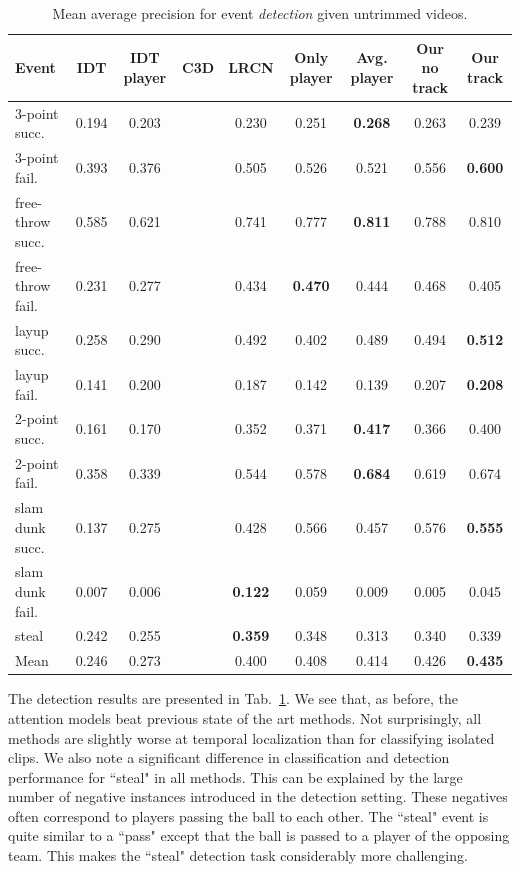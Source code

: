 \begin{table}[ht!]
\begin{center}
\small
 \begin{tabular}{|l|c|c|c|c|c|c|c|c|}
  \hline
Event & IDT\cite{Wang_CVPR11} & IDT player\cite{Wang_CVPR11} & C3D \cite{Tran_arxiv14} & LRCN \cite{Donahue_arxiv14} & Only player & Avg. player & Our no track & Our track \\ \hline \hline
3-point succ.    & 0.194  & 0.203 &  & 0.230 & 0.251 & \textbf{0.268} & 0.263 & 0.239 \\
3-point fail.    & 0.393  & 0.376 &  & 0.505 & 0.526 & 0.521 & 0.556 & \textbf{0.600} \\
free-throw succ. & 0.585  & 0.621 &  & 0.741 & 0.777 & \textbf{0.811} & 0.788 & 0.810 \\
free-throw fail. & 0.231  & 0.277 &  & 0.434 & \textbf{0.470} & 0.444 & 0.468 & 0.405 \\
layup succ.      & 0.258  & 0.290 &  & 0.492 & 0.402 & 0.489 & 0.494 & \textbf{0.512} \\
layup fail.      & 0.141  & 0.200 &  & 0.187 & 0.142 & 0.139 & 0.207 & \textbf{0.208} \\
2-point succ.    & 0.161  & 0.170 &  & 0.352 & 0.371 & \textbf{0.417} & 0.366 & 0.400 \\
2-point fail.    & 0.358  & 0.339 &  & 0.544 & 0.578 & \textbf{0.684} & 0.619 & 0.674 \\
  slam dunk succ.& 0.137  & 0.275 &  & 0.428 & 0.566 & 0.457 & 0.576 & \textbf{0.555} \\
slam dunk fail.  & 0.007  & 0.006 &  & \textbf{0.122} & 0.059 & 0.009 & 0.005 & 0.045 \\
steal            & 0.242  & 0.255 &  & \textbf{0.359} & 0.348 & 0.313 & 0.340 & 0.339 \\ \hline \hline
Mean             & 0.246  & 0.273 &  & 0.400 & 0.408 & 0.414 & 0.426 & \textbf{0.435} \\ \hline
  \end{tabular}
\end{center}
  \caption{Mean average precision for event {\em detection} given
    untrimmed videos.}
  \label{tab:detection_res}
\end{table}

The detection results are presented in Tab.~\ref{tab:detection_res}.  We see
that, as before, the attention models beat previous state of the art methods.
Not surprisingly, all methods are slightly worse at temporal localization than
for classifying isolated clips.  We also note a significant
difference in classification and detection performance for ``steal" in all
methods.  This can be explained by the large number of negative instances
introduced in the detection setting. These negatives often correspond to
players passing the ball to each other. The ``steal" event is quite similar to
a ``pass" except that the ball is passed to a player of the opposing team. This
makes the ``steal" detection task considerably more challenging.

